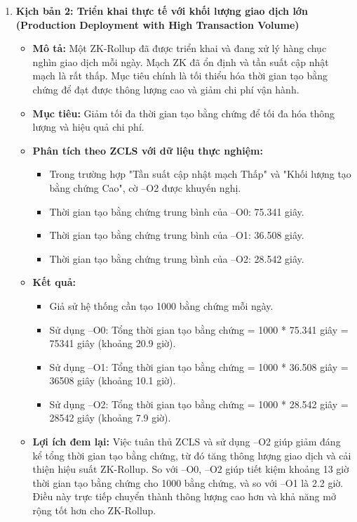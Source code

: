 \begin{enumerate}
\begin{itemize}
\end{itemize}

\item \textbf{Kịch bản 2: Triển khai thực tế với khối lượng giao dịch lớn (Production Deployment with High Transaction Volume)}

\begin{itemize}
\item\textbf{Mô tả:} Một ZK-Rollup đã được triển khai và đang xử lý hàng chục nghìn giao dịch mỗi ngày. Mạch ZK đã ổn định và tần suất cập nhật mạch là rất thấp. Mục tiêu chính là tối thiểu hóa thời gian tạo bằng chứng để đạt được thông lượng cao và giảm chi phí vận hành.

\item\textbf{Mục tiêu:} Giảm tối đa thời gian tạo bằng chứng để tối đa hóa thông lượng và hiệu quả chi phí.

\item\textbf{Phân tích theo ZCLS với dữ liệu thực nghiệm:}
\begin{itemize}
    \item Trong trường hợp "Tần suất cập nhật mạch Thấp" và "Khối lượng tạo bằng chứng Cao", cờ --O2 được khuyến nghị.
    \item Thời gian tạo bằng chứng trung bình của --O0: 75.341 giây.
    \item Thời gian tạo bằng chứng trung bình của --O1: 36.508 giây.
    \item Thời gian tạo bằng chứng trung bình của --O2: 28.542 giây.
\end{itemize}

\item\textbf{Kết quả:}
\begin{itemize}
    \item Giả sử hệ thống cần tạo 1000 bằng chứng mỗi ngày.
    \item Sử dụng --O0: Tổng thời gian tạo bằng chứng = 1000 * 75.341 giây = 75341 giây (khoảng 20.9 giờ).
    \item Sử dụng --O1: Tổng thời gian tạo bằng chứng = 1000 * 36.508 giây = 36508 giây (khoảng 10.1 giờ).
    \item Sử dụng --O2: Tổng thời gian tạo bằng chứng = 1000 * 28.542 giây = 28542 giây (khoảng 7.9 giờ).
\end{itemize}

\item\textbf{Lợi ích đem lại:} Việc tuân thủ ZCLS và sử dụng --O2 giúp giảm đáng kể tổng thời gian tạo bằng chứng, từ đó tăng thông lượng giao dịch và cải thiện hiệu suất ZK-Rollup. So với --O0, --O2 giúp tiết kiệm khoảng 13 giờ thời gian tạo bằng chứng cho 1000 bằng chứng, và so với --O1 là 2.2 giờ. Điều này trực tiếp chuyển thành thông lượng cao hơn và khả năng mở rộng tốt hơn cho ZK-Rollup.
\end{itemize}

    \end{enumerate}
